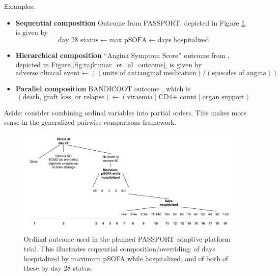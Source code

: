 \documentclass[
  11pt,
  fleqn
]{article}
\begin{document}
Examples:

\begin{itemize}
  \item \textbf{Sequential composition} Outcome from PASSPORT,
    depicted in Figure
    \ref{fig:passport_outcome}, is given by
    \[ \text{day 28 status} \leftarrow \text{max pSOFA} \leftarrow \text{days
      hospitalized}
    \]
  \item
    \textbf{Hierarchical composition} ``Angina Symptom Score'' outcome from
    \citet{rajkumarPlaceboControlledTrialPercutaneous2023}, depicted in Figure
    \ref{fig:rajkumar_et_al_outcome}, is given by \[
      \text{adverse clinical event} \leftarrow ((\text{units of
    antianginal medication}) / (\text{episodes of angina})) \]

  \item \textbf{Parallel composition} BANDICOOT outcome
    \citep{walkerCodesigningNovelOrdinal2025}, which is
    \[
      (\text{death, graft loss, or relapse}) \leftarrow (\text{viraemia} \;|\;
      \text{CD4+ count} \;|\; \text{organ support})
    \]
\end{itemize}

Aside: \citet{wittkowskiCombiningSeveralOrdinal2004} consider combining
ordinal variables into partial orders. This makes more sense in the
generalized pairwise comparisons framework.

\begin{figure}
  \includegraphics[width=7in]{passport_ordinal_outcome_sequential.pdf}
  \caption{Ordinal outcome used in the planned PASSPORT adaptive
    platform trial. This illustrates sequential composition/overriding:
    of days hospitalized by maximum pSOFA while hospitalized, and of
  both of these by day 28 status.}
  \label{fig:passport_outcome}
\end{figure}
\end{document}
